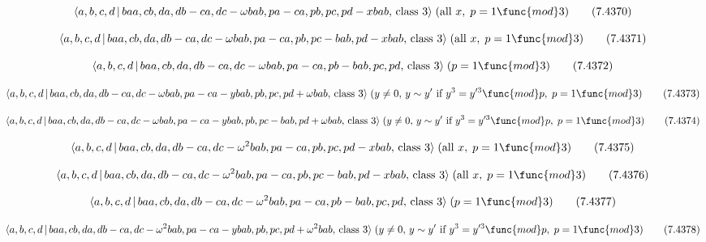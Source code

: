 \documentclass[10pt]{article}
\begin{document}
\begin{equation}
\langle a,b,c,d\,|\,baa,cb,da,db-ca,dc-\omega bab,pa-ca,pb,pc,pd-xbab,\,%
\text{class }3\rangle \;(\text{all }x,\;p=1\func{mod}3)  \tag{7.4370}
\end{equation}

\begin{equation}
\langle a,b,c,d\,|\,baa,cb,da,db-ca,dc-\omega bab,pa-ca,pb,pc-bab,pd-xbab,\,%
\text{class }3\rangle \;(\text{all }x,\;p=1\func{mod}3)  \tag{7.4371}
\end{equation}

\begin{equation}
\langle a,b,c,d\,|\,baa,cb,da,db-ca,dc-\omega bab,pa-ca,pb-bab,pc,pd,\,\text{%
class }3\rangle \;(p=1\func{mod}3)  \tag{7.4372}
\end{equation}

\begin{equation}
\langle a,b,c,d\,|\,baa,cb,da,db-ca,dc-\omega bab,pa-ca-ybab,pb,pc,pd+\omega
bab,\,\text{class }3\rangle \;(y\neq 0,\,y\sim y^{\prime }\text{ if }%
y^{3}=y^{\prime 3}\func{mod}p,\;p=1\func{mod}3)  \tag{7.4373}
\end{equation}

\begin{equation}
\langle a,b,c,d\,|\,baa,cb,da,db-ca,dc-\omega
bab,pa-ca-ybab,pb,pc-bab,pd+\omega bab,\,\text{class }3\rangle \;(y\neq
0,\,y\sim y^{\prime }\text{ if }y^{3}=y^{\prime 3}\func{mod}p,\;p=1\func{mod}%
3)  \tag{7.4374}
\end{equation}

\begin{equation}
\langle a,b,c,d\,|\,baa,cb,da,db-ca,dc-\omega ^{2}bab,pa-ca,pb,pc,pd-xbab,\,%
\text{class }3\rangle \;(\text{all }x,\;p=1\func{mod}3)  \tag{7.4375}
\end{equation}

\begin{equation}
\langle a,b,c,d\,|\,baa,cb,da,db-ca,dc-\omega
^{2}bab,pa-ca,pb,pc-bab,pd-xbab,\,\text{class }3\rangle \;(\text{all }x,\;p=1%
\func{mod}3)  \tag{7.4376}
\end{equation}

\begin{equation}
\langle a,b,c,d\,|\,baa,cb,da,db-ca,dc-\omega ^{2}bab,pa-ca,pb-bab,pc,pd,\,%
\text{class }3\rangle \;(p=1\func{mod}3)  \tag{7.4377}
\end{equation}

\begin{equation}
\langle a,b,c,d\,|\,baa,cb,da,db-ca,dc-\omega
^{2}bab,pa-ca-ybab,pb,pc,pd+\omega ^{2}bab,\,\text{class }3\rangle \;(y\neq
0,\,y\sim y^{\prime }\text{ if }y^{3}=y^{\prime 3}\func{mod}p,\;p=1\func{mod}%
3)  \tag{7.4378}
\end{equation}
\end{document}
